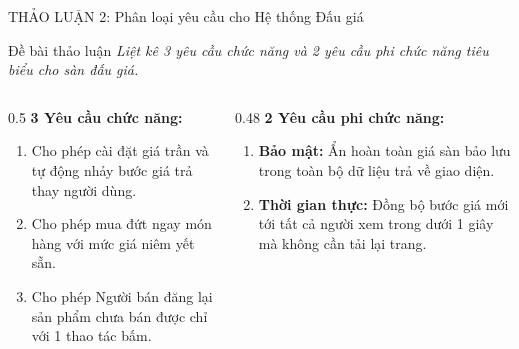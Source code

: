 \documentclass[aspectratio=169, 10pt]{beamer}
\begin{document}
\begin{frame}{THẢO LUẬN 2: Phân loại yêu cầu cho Hệ thống Đấu giá}
    \begin{block}{Đề bài thảo luận}
        \textit{Liệt kê 3 yêu cầu chức năng và 2 yêu cầu phi chức năng tiêu biểu cho sàn đấu giá.}
    \end{block}
    \vspace{0.2cm}
    \begin{columns}[t]
        \begin{column}{0.5\textwidth}
            \textbf{3 Yêu cầu chức năng:}
            \begin{enumerate}
                \item Cho phép cài đặt giá trần và tự động nhảy bước giá trả thay người dùng.
                \item Cho phép mua đứt ngay món hàng với mức giá niêm yết sẵn.
                \item Cho phép Người bán đăng lại sản phẩm chưa bán được chỉ với 1 thao tác bấm.
            \end{enumerate}
        \end{column}
        \begin{column}{0.48\textwidth}
            \textbf{2 Yêu cầu phi chức năng:}
            \begin{enumerate}
                \item \textbf{Bảo mật:} Ẩn hoàn toàn giá sàn bảo lưu trong toàn bộ dữ liệu trả về giao diện.
                \item \textbf{Thời gian thực:} Đồng bộ bước giá mới tới tất cả người xem trong dưới 1 giây mà không cần tải lại trang.
            \end{enumerate}
        \end{column}
    \end{columns}
\end{frame}
\end{document}
